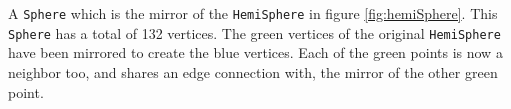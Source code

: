 \label{fig:fullSphere} A \verb|Sphere| which is the mirror of the \verb|HemiSphere| in figure \ref{fig:hemiSphere}. This \verb|Sphere| has a total of 132 vertices. The green vertices of the original \verb|HemiSphere| have been mirrored to create the blue vertices. Each of the green points is now a neighbor too, and shares an edge connection with, the mirror of the other green point.